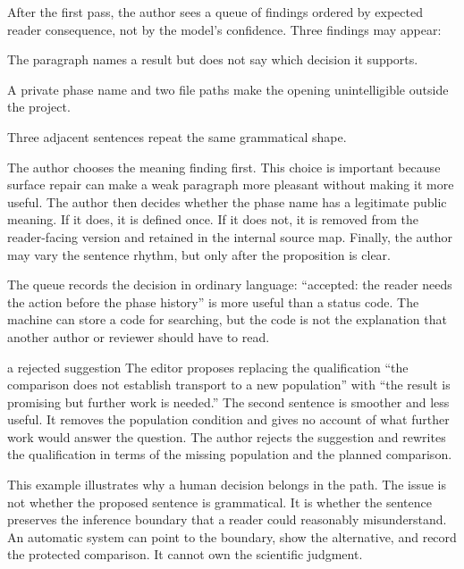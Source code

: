 After the first pass, the author sees a queue of findings ordered by expected
reader consequence, not by the model's confidence. Three findings may appear:

\begin{description}[style=nextline,leftmargin=34mm,labelindent=0mm]
\item[Meaning] The paragraph names a result but does not say which decision it
supports.
\item[Register] A private phase name and two file paths make the opening
unintelligible outside the project.
\item[Surface] Three adjacent sentences repeat the same grammatical shape.
\end{description}

The author chooses the meaning finding first. This choice is important because
surface repair can make a weak paragraph more pleasant without making it more
useful. The author then decides whether the phase name has a legitimate public
meaning. If it does, it is defined once. If it does not, it is removed from the
reader-facing version and retained in the internal source map. Finally, the
author may vary the sentence rhythm, but only after the proposition is clear.

The queue records the decision in ordinary language: ``accepted: the reader
needs the action before the phase history'' is more useful than a status code.
The machine can store a code for searching, but the code is not the explanation
that another author or reviewer should have to read.

\begin{cardexample}{a rejected suggestion}
The editor proposes replacing the qualification ``the comparison does not
establish transport to a new population'' with ``the result is promising but
further work is needed.'' The second sentence is smoother and less useful. It
removes the population condition and gives no account of what further work
would answer the question. The author rejects the suggestion and rewrites the
qualification in terms of the missing population and the planned comparison.
\end{cardexample}

This example illustrates why a human decision belongs in the path. The issue
is not whether the proposed sentence is grammatical. It is whether the sentence
preserves the inference boundary that a reader could reasonably misunderstand.
An automatic system can point to the boundary, show the alternative, and
record the protected comparison. It cannot own the scientific judgment.

